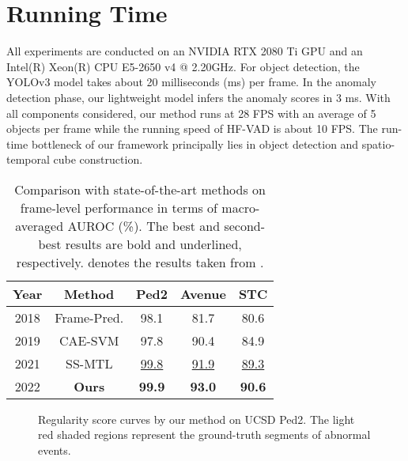 \documentclass[runningheads]{llncs}
\begin{document}
\section{Running Time}
All experiments are conducted on an NVIDIA RTX 2080 Ti GPU and an Intel(R) Xeon(R) CPU E5-2650 v4 @ 2.20GHz. For object detection, the YOLOv3 model \cite{redmon2018yolov3} takes about 20 milliseconds (ms) per frame. In the anomaly detection phase, our lightweight model infers the anomaly scores in 3 ms. With all components considered, our method runs at 28 FPS with an average of 5 objects per frame while the running speed of HF-VAD is about 10 FPS. The run-time bottleneck of our framework principally lies in object detection and spatio-temporal cube construction. 



\begin{table}[!ht]
	\centering
	\caption{Comparison with state-of-the-art methods on frame-level performance in terms of macro-averaged AUROC (\%). The best and second-best results are bold and underlined, respectively.  denotes the results taken from \cite{georgescu2020background}.}
	\begin{threeparttable}
		\begin{tabular}{c|c|ccc}
			\hline
			\textbf{Year}     & \textbf{Method}   & \textbf{Ped2} & \textbf{Avenue} & \textbf{STC} \\ \hline
			
			2018 & Frame-Pred. \cite{liu2018future}  & 98.1 & 81.7 & 80.6 \\
			\hline
			
			2019 & CAE-SVM \cite{ionescu2019object}  & 97.8 & 90.4 & 84.9 \\ \hline
			2021 & SS-MTL \cite{georgescu2021anomaly}& \underline{99.8} & \underline{91.9} & \underline{89.3} \\ \hline
2022 & \textbf{Ours}   & \textbf{99.9}  & \textbf{93.0}  & \textbf{90.6} \\
			\hline
			
			
		\end{tabular}
		
	\end{threeparttable}
	\label{tab:macro}
\end{table}


\begin{figure}[!h]
	\centering
	
	\caption{Regularity score curves by our method on UCSD Ped2. The light red shaded regions represent the ground-truth segments of abnormal events.}
	\label{fig:ped2}
\end{figure}
\end{document}
